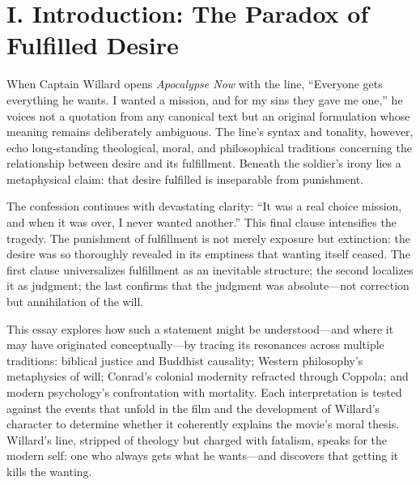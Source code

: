 \section*{I. Introduction: The Paradox of Fulfilled Desire}
\label{sec:i-introduction-the-paradox-of-fulfilled-desire}
When Captain Willard opens \textit{Apocalypse Now} \parencite{CoppolaApocalypse1979} with the
line, ``Everyone gets everything he wants. I wanted a mission, and for my sins they gave me
one,'' he voices not a quotation from any canonical text but an original formulation whose
meaning remains deliberately ambiguous. The line's syntax and
tonality, however, echo long-standing theological, moral, and philosophical traditions
concerning the relationship between desire and its fulfillment. Beneath the soldier's irony
lies a metaphysical claim: that desire fulfilled is inseparable from punishment.

The confession continues with devastating clarity: ``It was a real choice mission, and when it
was over, I never wanted another.'' This final clause intensifies the tragedy. The punishment
of fulfillment is not merely exposure but extinction: the desire was so thoroughly revealed in
its emptiness that wanting itself ceased. The first clause universalizes fulfillment as an
inevitable structure; the second localizes it as judgment; the last confirms that the judgment
was absolute---not correction but annihilation of the will.

This essay explores how such a statement might be understood—and where it may have originated
conceptually—by tracing its resonances across multiple traditions: biblical justice and
Buddhist causality; Western philosophy's metaphysics of will; Conrad's colonial modernity
refracted through Coppola; and modern psychology's confrontation with mortality. Each
interpretation is tested against the events that unfold in the film and the development of
Willard's character to determine whether it coherently explains the movie's moral thesis.
Willard's line, stripped of theology but charged with fatalism, speaks for the modern self:
one who always gets what he wants—and discovers that getting it kills the wanting.
